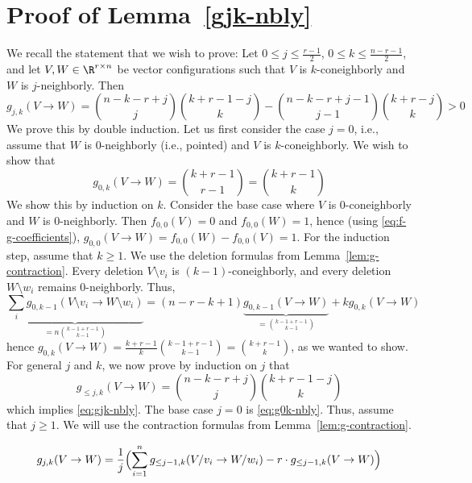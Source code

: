 \section{Proof of Lemma~\ref{gjk-nbly}}
\label{sec:proof-gjk-nbly}
%
We recall the statement that we wish to prove: Let $0\leq j\leq \frac{r-1}{2}$, $0\leq k\leq \frac{n-r-1}{2}$, and let $V,W \in \R^{r\times n}$ be vector configurations such that $V$ is $k$-coneighborly and $W$ is $j$-neighborly. Then 
\begin{equation*}
\textstyle g_{j,k}(V\to W)=\binom{n-k-r+j}{j}\binom{k+r-1-j}{k} - \binom{n-k-r+j-1}{j-1} \binom{k+r-j}{k} > 0
\end{equation*}
We prove this by double induction. Let us first consider the case $j=0$, i.e., assume that $W$ is $0$-neighborly (i.e., pointed) and $V$ is $k$-coneighborly. We wish to show that
\begin{equation}
\label{eq:g0k-nbly}
g_{0,k}(V\to W)=\binom{k+r-1}{r-1}=\binom{k+r-1}{k}
\end{equation}
We show this by induction on $k$. Consider the base case where $V$ is $0$-coneighborly and $W$ is $0$-neighborly. Then $f_{0,0}(V)=0$ and $f_{0,0}(W)=1$, hence (using  \eqref{eq:f-g-coefficients}), $g_{0,0}(V\to W)=f_{0,0}(W)-f_{0,0}(V)=1$. 
For the induction step, assume that $k\geq 1$. We use the deletion formulas from Lemma~\ref{lem:g-contraction}. Every deletion $V\setminus v_i$ is $(k-1)$-coneighborly, and every deletion $W\setminus w_i$ remains $0$-neighborly. Thus,
\[
\underbrace{\sum_i g_{0,k-1}(V\setminus v_i \to W\setminus w_i)}_{=n\binom{k-1+r-1}{k-1}}=(n-r-k+1)\underbrace{g_{0,k-1}(V\to W)}_{=\binom{k-1+r-1}{k-1}} + k g_{0,k}(V\to W)
\]
hence $g_{0,k}(V\to W)=\frac{k+r-1}{k}\binom{k-1+r-1}{k-1}=\binom{k+r-1}{k}$, as we wanted to show.
%
For general $j$ and $k$, we now prove by induction on $j$ that 
\begin{equation}
\label{eq:gleqjk-nbly}
g_{\leq j, k}(V\to W) = \binom{n-k-r+j}{j} \binom{k+r-1-j}{k}
\end{equation}
which implies \eqref{eq:gjk-nbly}.
The base case $j=0$ is \eqref{eq:g0k-nbly}. Thus, assume that $j\geq 1$. We will use the contraction formulas from Lemma~\ref{lem:g-contraction}. 
\begin{claim}
\[ g_{j,k}(V \to W) = \dfrac{1}{j} \Bigl(\sum_{i=1}^n g_{\leq j-1, k}(V/v_i \to W/w_i) - r \cdot g_{\leq j-1, k}(V \to W) \Bigr) \]
\end{claim}
